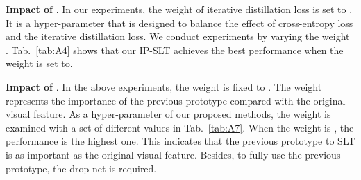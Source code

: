 \documentclass[10pt,twocolumn,letterpaper]{article}
\begin{document}
     \setlength{\tabcolsep}{2.7pt}
    \begin{table}[!t]
     \scriptsize
     \vspace{0.5mm}
     \caption{Effect of the different refinement methods. `Con-input' denotes directly concatenating the original visual feature and previous prototype as input. `Con-feature' denotes concatenating the original feature and the previous feature given by the cross-attention mechanism in each layer. On top of that, `Add-feature' denotes changing it to an addition operation.}
     \label{tab:A6}
     \vspace{-1mm}
     \end{table}
     

    

    \smallskip
    \noindent \textbf{Impact of }.
    In our experiments, the weight  of iterative distillation loss is set to . It is a hyper-parameter that is designed to balance the effect of cross-entropy loss and the iterative distillation loss.
    We conduct experiments by varying the weight .
    Tab.~\ref{tab:A4} shows that our IP-SLT achieves the best performance when the weight  is set to.
    
    
    \smallskip
    \noindent \textbf{Impact of }.
    In the above experiments, the weight  is fixed to . The weight  represents the importance of the previous prototype compared with the original visual feature. As a hyper-parameter of our proposed methods, the weight  is examined with a set of different values in Tab.~\ref{tab:A7}.
    When the weight is , the performance is the highest one.
    This indicates that the previous prototype to SLT is as important as the original visual feature. 
    Besides, to fully use the previous prototype, the drop-net is required.
    
\end{document}
